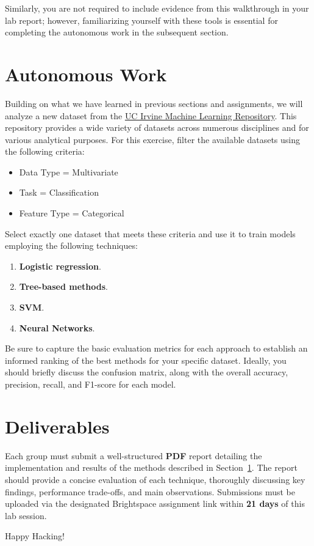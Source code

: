\documentclass{article}
\begin{document}
Similarly, you are not required to include evidence from this walkthrough in your lab report; however, familiarizing yourself with these tools is essential for completing the autonomous work in the subsequent section.

\section{Autonomous Work}
\label{sec:work}

Building on what we have learned in previous sections and assignments, we will analyze a new dataset from the \href{https://archive.ics.uci.edu/datasets}{UC Irvine Machine Learning Repository}. This repository provides a wide variety of datasets across numerous disciplines and for various analytical purposes. For this exercise, filter the available datasets using the following criteria:

\begin{itemize}
  \item Data Type = Multivariate
  \item Task = Classification
  \item Feature Type = Categorical
\end{itemize}

Select exactly one dataset that meets these criteria and use it to train models employing the following techniques:

\begin{enumerate}
  \item \textbf{Logistic regression}.
  \item \textbf{Tree-based methods}.
  \item \textbf{SVM}.
  \item \textbf{Neural Networks}.
\end{enumerate}

Be sure to capture the basic evaluation metrics for each approach to establish an informed ranking of the best methods for your specific dataset. Ideally, you should briefly discuss the confusion matrix, along with the overall accuracy, precision, recall, and F1-score for each model.

\section{Deliverables}
Each group must submit a well-structured \textbf{PDF} report detailing the implementation and results of the methods described in Section~\ref{sec:work}. The report should provide a concise evaluation of each technique, thoroughly discussing key findings, performance trade-offs, and main observations. Submissions must be uploaded via the designated Brightspace\texttrademark{} assignment link within \textbf{21 days} of this lab session.

\vspace{5mm}
Happy Hacking! 
\end{document}
